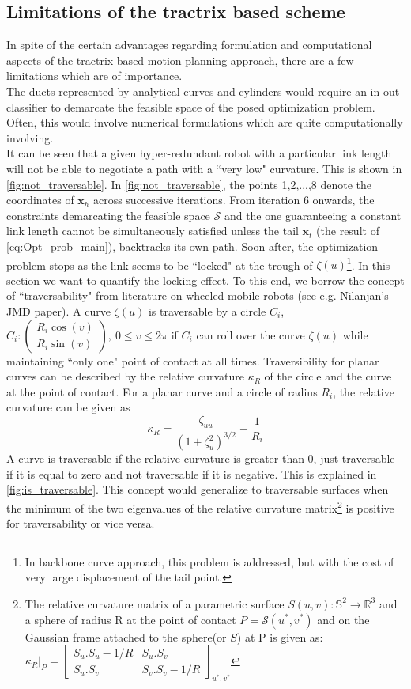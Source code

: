 \documentclass[12pt,a4]{article}
\begin{document}
\subsection{Limitations of the tractrix based scheme}
In spite of the certain advantages regarding formulation and computational aspects of the tractrix based motion planning approach, there are a few limitations which are of importance.\\
The ducts represented by analytical curves and cylinders would require an in-out classifier to demarcate the feasible space of the posed optimization problem. Often, this would involve numerical formulations which are quite computationally involving.\\
It can be seen that a given hyper-redundant robot with a particular link length will not be able to negotiate a path with a ``very low" curvature. This is shown in \cref{fig:not_traversable}. In \cref{fig:not_traversable}, the points 1,2,...,8 denote the coordinates of $\textbf{x}_h$ across successive iterations. From iteration 6 onwards, the constraints demarcating the feasible space $\mathcal{S}$ and the one guaranteeing a constant link length cannot be simultaneously satisfied unless the tail $\textbf{x}_t$ (the result of \cref{eq:Opt_prob_main}), backtracks its own path. Soon after, the optimization problem stops as the link seems to be ``locked" at the trough of $\zeta(u)$\footnote{In backbone curve approach, this problem is addressed, but with the cost of very large displacement of the tail point.}. In this section we want to quantify the locking effect. To this end, we borrow the concept of ``traversability" from literature on wheeled mobile robots (see e.g. Nilanjan's JMD paper). A curve $\zeta(u)$ is traversable by a circle $C_i$, $C_i: \left(\begin{array}{c} R_i\cos(v) \\ R_i\sin(v) \end{array}\right), ~ 0 \leq v\leq2\pi $  if $C_i$ can roll over the curve $\zeta(u)$ while maintaining ``only one" point of contact at all times. Traversibility for planar curves can be described by the relative curvature $\kappa_R$ of the circle and the curve at the point of contact. For a planar curve and a circle of radius $R_i$, the relative curvature can be given as \[\kappa_R=\dfrac{\zeta_{uu}}{(1+\zeta_u^2)^{3/2}}-\dfrac{1}{R_i}\] A curve is traversable if the relative curvature is greater than 0, just traversable if it is equal to zero and not traversable if it is negative. This is explained in \cref{fig:is_traversable}. This concept would generalize to traversable surfaces when the minimum of the two eigenvalues of the relative curvature matrix\footnote{The relative curvature matrix of a parametric surface ${S}(u,v): \mathbb{S}^2\to \mathbb{R}^3$ and a sphere of radius R at the point of contact $P = \mathcal{S}(u^*,v^*)$ and on the Gaussian frame attached to the sphere(or $ S $) at P is given as: $\kappa_R\vert_P=\left[\begin{array}{cc}
	{S}_u.{S}_u-1/R & {S}_u.{S}_v \\ 
	{S}_u.{S}_v & {S}_v.{S}_v-1/R
	\end{array}\right]_{u^*,v^*} $} is positive for traversability or vice versa.
\end{document}

